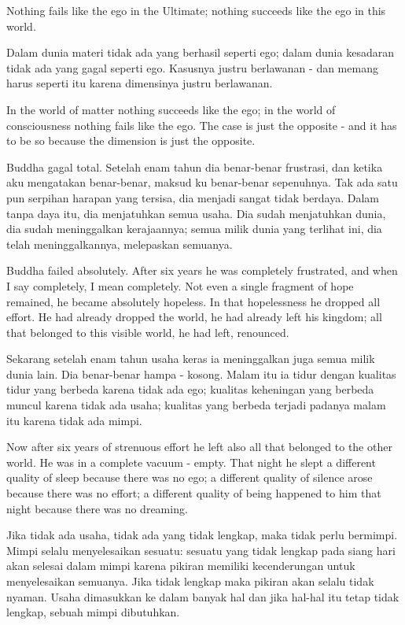 \english
Nothing fails like the ego in the Ultimate; nothing succeeds like the ego in this world.

\bahasa
Dalam dunia materi tidak ada yang berhasil seperti ego; dalam dunia kesadaran tidak ada yang gagal seperti ego. Kasusnya justru berlawanan - dan memang harus seperti itu karena dimensinya justru berlawanan.

\english
In the world of matter nothing succeeds like the ego; in the world of consciousness nothing fails like the ego. The case is just the opposite - and it has to be so because the dimension is just the opposite.

\bahasa
Buddha gagal total. Setelah enam tahun dia benar-benar frustrasi, dan ketika aku mengatakan benar-benar, maksud ku benar-benar sepenuhnya. Tak ada satu pun serpihan harapan yang tersisa, dia menjadi sangat tidak berdaya. Dalam tanpa daya itu, dia menjatuhkan semua usaha. Dia sudah menjatuhkan dunia, dia sudah meninggalkan kerajaannya; semua milik dunia yang terlihat ini, dia telah meninggalkannya, melepaskan semuanya.

\english
Buddha failed absolutely. After six years he was completely frustrated, and when I say completely, I mean completely. Not even a single fragment of hope remained, he became absolutely hopeless. In that hopelessness he dropped all effort. He had already dropped the world, he had already left his kingdom; all that belonged to this visible world, he had left, renounced.

\bahasa
Sekarang setelah enam tahun usaha keras ia meninggalkan juga semua milik dunia lain. Dia benar-benar hampa - kosong. Malam itu ia tidur dengan kualitas tidur yang berbeda karena tidak ada ego; kualitas keheningan yang berbeda muncul karena tidak ada usaha; kualitas yang berbeda terjadi padanya malam itu karena tidak ada mimpi.

\english
Now after six years of strenuous effort he left also all that belonged to the other world. He was in a complete vacuum - empty. That night he slept a different quality of sleep because there was no ego; a different quality of silence arose because there was no effort; a different quality of being happened to him that night because there was no dreaming.

\bahasa
Jika tidak ada usaha, tidak ada yang tidak lengkap, maka tidak perlu bermimpi. Mimpi selalu menyelesaikan sesuatu: sesuatu yang tidak lengkap pada siang hari akan selesai dalam mimpi karena pikiran memiliki kecenderungan untuk menyelesaikan semuanya. Jika tidak lengkap maka pikiran akan selalu tidak nyaman. Usaha dimasukkan ke dalam banyak hal dan jika hal-hal itu tetap tidak lengkap, sebuah mimpi dibutuhkan.

